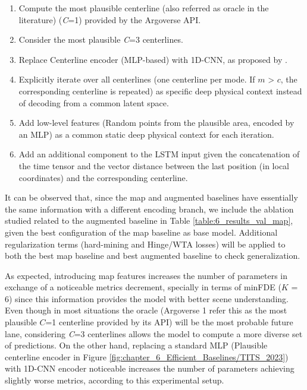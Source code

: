 \begin{enumerate}
	
	\item Compute the most plausible centerline (also referred as oracle in the literature) (\textit{C}=1) provided by the Argoverse \ac{API}.
	
	\item Consider the most plausible \textit{C}=3 centerlines.
	
	\item Replace Centerline encoder (\ac{MLP}-based) with 1D-\ac{CNN}, as proposed by \cite{mercat2020multi}.
	
	\item Explicitly iterate over all centerlines (one centerline per mode. If $m$ > $c$, the corresponding centerline is repeated) as specific deep physical context instead of decoding from a common latent space.
	
	\item Add low-level features (Random points from the plausible area, encoded by an \ac{MLP}) as a common static deep physical context for each iteration.
	
	\item Add an additional component to the \ac{LSTM} input given the concatenation of the time tensor and the vector distance between the last position (in local coordinates) and the corresponding centerline.
	
\end{enumerate}

It can be observed that, since the map and augmented baselines have essentially the same information with a different encoding branch, we include the ablation studied related to the augmented baseline in Table \ref{table:6_results_val_map}, given the best configuration of the map baseline as base model. Additional regularization terms (hard-mining and Hinge/\ac{WTA} losses) will be applied to both the best map baseline and best augmented baseline to check generalization. 

As expected, introducing map features increases the number of parameters in exchange of a noticeable metrics decrement, specially in terms of \ac{minFDE} ($K$ = 6) since this information provides the model with better scene understanding. Even though in most situations the oracle (Argoverse 1 refer this as the most plausible $C$=1 centerline provided by its \ac{API}) will be the most probable future lane, considering \textit{C}=3 centerlines allows the model to compute a more diverse set of predictions. On the other hand, replacing a standard \ac{MLP} (Plausible centerline encoder in Figure \ref{fig:chapter_6_Efficient_Baselines/TITS_2023}) with 1D-\ac{CNN} encoder noticeable increases the number of parameters achieving slightly worse metrics, according to this experimental setup.

